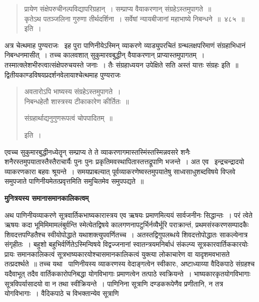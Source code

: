 \documentclass[11pt, openany]{book}
\begin{document}
\begin{quote}
{\mbh प्रायेण संक्षेपरुचीनल्पविद्यापरिग्रहान्~। सम्प्राप्य वैयाकरणान् संग्रहेऽस्तमुपागते~॥\\
कृतेऽथ पतञ्जलिना गुरुणा तीर्थदर्शिना~। सर्वेषां न्यायबीजानां महाभाष्ये निबन्धने~॥~४८५~॥} इति~।
\end{quote}

अत्र चेत्थमाह पुण्यराजः \textendash\ इह पुरा पाणिनीयेऽस्मिन् व्याकरणे व्याड्युपरचितं ग्रन्थलक्षपरिमाणं संग्रहाभिधानं निबन्धनमासीत्~। तच्च कालवशात् सुकुमारवबुद्धीन् वैयाकरणान् प्राप्यास्तमुपागतम्~। तस्मात्क्लेशभीरुत्वात्संक्षेपरुचयस्ते जनाः~। तैः संग्रहाध्ययन उपेक्षिते सति अस्तं यात्तः संग्रहः इति~॥\\

द्वितीयकाण्डविषयप्रदर्शनवेलायाश्चेत्थमाह पुण्यराजः \textendash\ 

\begin{quote}
{\qt अवतारोऽपि भाष्यस्य संग्रहेऽस्तमुपागते~।\\
निबन्धहेतौ शास्त्रस्य टीकाकारेण कीर्तितः~॥

संग्रहार्थाद्यनुगुणरूपत्वं चोपपादितम्~॥} इति~।
\end{quote}

एवच्च सुकुमारबुद्धीनध्येतॄन् सम्प्राप्य ते ते व्याकरणागमास्तस्मिंस्तस्मिन्नवसरे शनैः शनैरस्तमुपयातास्तैस्तैराचार्यैः पुनः पुनः प्रकृतिमवस्थापितास्तत्तद्रूपाणि भजन्ते~। अत एव \textendash\ इन्द्रचन्द्रादयो व्याकरणकारा बहवः श्रूयन्ते~। समयप्राबल्यात् पूर्वव्याकरणेष्वस्तमुपयातेषु साध्वसाधुशब्दविषये विप्लवे समुपजाते पाणिनीयमेतत्प्रवृत्तमिति समुचितमेव समुपपद्यते~॥ 

\begin{center}
\textbf{\large मुनित्रयस्य समानासमानकालिकत्वम् \textendash\ }
\end{center}

अथ पाणिनीयव्याकरणे सूत्रवार्तिकभाष्यकारास्त्रय एव ऋषयः प्रमाणमित्ययं सार्वजनीनः सिद्धान्तः~। परं त्वेते ऋषयः कदा भूमिमिमामलंबुर्वन्ति स्मेत्येतद्विषये कालगणनापटुर्भिर्नव्यैर्भूरि पराक्रान्तं, प्रथमसंस्करणसम्पादकैः शिवदत्तपण्डितैश्च स्वीयोपोद्धाते यथाशक्त्युपवर्णितच्च~। अतस्तद्विगुपलब्धये शिवदत्तोपोद्धातः साकल्येनात्र संगृहीतः~। बहुशो बहुभिर्वर्णितेऽस्मिन्विषये विद्वज्जनानां स्वातन्त्रयमनिर्बाधं संकल्प्य सूत्रकारवार्तिककारयोः प्रायः समानकालिकत्वं सूत्रभाष्यकारयोश्चासमानकालिकत्वं युक्त्या लोकाचारेण वा यादृशमवभासते तत्प्रदर्श्थते~॥ तच्च यथा \textendash\ पाणिनीयस्य व्याकरणस्य वेदाङ्गत्वेन स्वीकारः, अष्टाध्याय्या वैदिकपाठे संग्रहश्च यदैवाभूत् तदैव वार्तिककारोपनिबद्धा योगविभागाः प्रमाणत्वेन तत्पाठे स्वक्रियन्ते~। भाष्यकारकृतयोगविभागाः सूत्रविपर्यासादयो वा न तथा स्वीक्रियन्ते~। पाणिनिना सूत्राणि दण्डकरूपेणैव प्रणीतानि, न तत्र योगविभागाः~। वैदिकपाठे च विभक्तान्येव सूत्राणि
\end{document}
